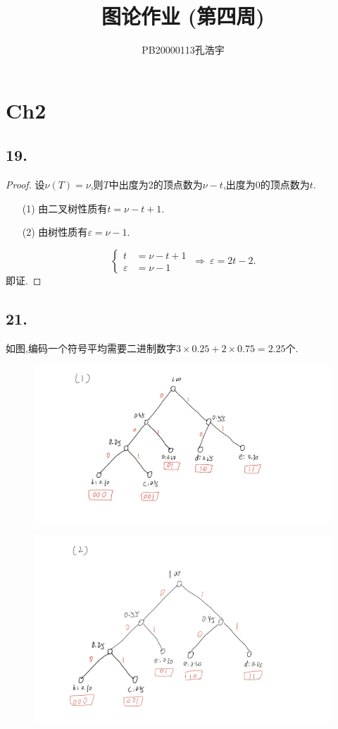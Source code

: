 \documentclass{article}
\title{图论作业 (第四周)}
\author{PB20000113孔浩宇}
\begin{document}
\maketitle
\section*{Ch2}
\subsection*{19.}
\begin{proof}
    设$\nu(T)=\nu$,则$T$中出度为2的顶点数为$\nu -t$,出度为0的顶点数为$t$.
    \begin{enumerate}
        \item [(1)]由二叉树性质有$t=\nu -t+1$.
        \item [(2)]由树性质有$\varepsilon=\nu -1$.
    \end{enumerate}
    \[
        \begin{cases}
            t &= \nu -t+1\\
            \varepsilon &=\nu -1
        \end{cases}
        \ \Rightarrow
        \ \varepsilon=2t-2.
    \]
    即证.
\end{proof}
\subsection*{21.}如图,编码一个符号平均需要二进制数字$3\times 0.25+2\times 0.75=2.25$个.
\begin{figure}[h]
    \centering
    \includegraphics[scale=0.4]{01.jpg}
\end{figure}
\begin{figure}[h]
    \centering
    \includegraphics[scale=0.4]{02.jpg}
\end{figure}
\clearpage
\end{document}
